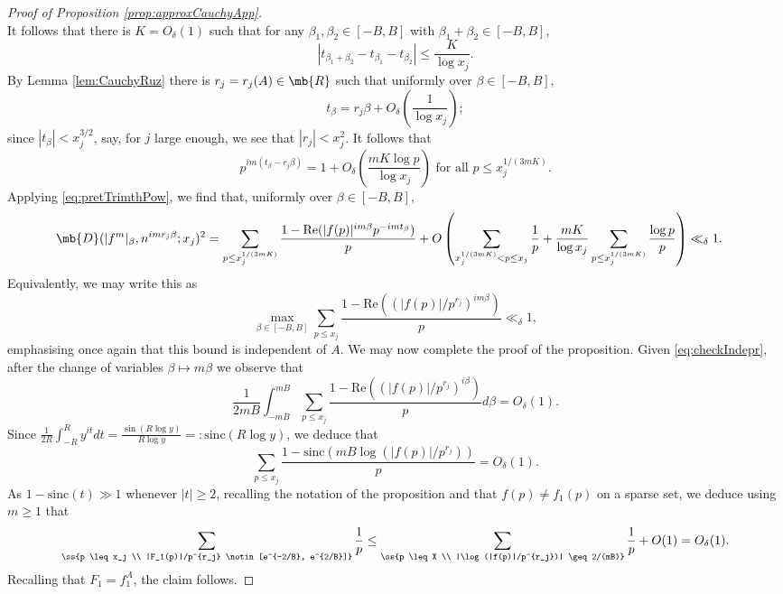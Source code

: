 \begin{proof}[Proof of Proposition \ref{prop:approxCauchyApp}]
$$$$
It follows that there is $K = O_{\delta}(1)$ such that for any $\beta_1,\beta_2 \in [-B,B]$ with $\beta_1+\beta_2 \in [-B,B]$,
$$
|t_{\beta_1+\beta_2} - t_{\beta_1} - t_{\beta_2}| \leq \frac{K}{\log x_j}. 
$$
%
By Lemma \ref{lem:CauchyRuz} there is $r_j = r_j(A) \in \mb{R}$ such that uniformly over $\beta \in [-B,B]$,
$$
t_{\beta} = r_j \beta + O_{\delta}\left(\frac{1}{\log x_j}\right);
$$
since $|t_{\beta}| < x_j^{3/2}$, say, for $j$ large enough, we see that $|r_j| < x_j^{2}$. It follows that
$$
p^{im(t_{\beta}-r_j\beta)} = 1 + O_{\delta}\left(\frac{mK \log p}{\log x_j}\right) 
%
\text{ for all } p \leq x_j^{1/(3mK)}.
$$ 
Applying \eqref{eq:pretTrimthPow}, we find that, uniformly over $\beta \in [-B,B]$, 
%
\begin{align*}
%
\mb{D}(|f^m|_{\beta}, n^{imr_j\beta};x_j)^2 &= \sum_{p \leq x_j^{1/(3mK)}} \frac{1-\text{Re}(|f(p)|^{im\beta}p^{-im t_{\beta}})}{p} + O\left(\sum_{x_j^{1/(3mK)}<p \leq x_j} \frac{1}{p} + \frac{mK}{\log x_j} \sum_{p \leq x_j^{1/(3mK)}} \frac{\log p}{p}\right) 
%
\ll_\delta 1.
\end{align*}
%
%
%
%
%
%
%
%
%
%
%
%
%
%
%
%
%
%
%
%
%
%
%
%
%
%
%
%
%
%
%
%
%
Equivalently, we may write this as
\begin{equation}\label{eq:checkIndepr}
\max_{\beta \in [-B,B]} \sum_{p \leq x_j} \frac{1-\text{Re}((|f(p)|/p^{r_j})^{im\beta})}{p} \ll_{\delta} 1,
\end{equation}
emphasising once again that this bound is independent of $A$.  
%
%
%
%
%
%
%
%
%
%
%
%
%
We may now complete the proof of the proposition. Given \eqref{eq:checkIndepr}, after the change of variables $\beta \mapsto m\beta$ we observe that
$$
\frac{1}{2mB} \int_{-mB}^{mB} \sum_{p \leq x_j} \frac{1-\text{Re}((|f(p)|/p^{r_j})^{i\beta})}{p} d\beta
%
= O_{\delta}(1).
$$
Since $\frac{1}{2R} \int_{-R}^R y^{it} dt = \frac{\sin(R \log y)}{R\log y} =: \text{sinc}(R\log y)$, we deduce that
$$
\sum_{p \leq x_j} \frac{1-\text{sinc}(mB\log(|f(p)|/p^{r_j}))}{p} = O_{\delta}(1).
$$
As $1-\text{sinc}(t) \gg 1$ whenever $|t| \geq 2$, recalling the notation of the proposition and that $f(p) \neq f_1(p)$ on a sparse set, we deduce using $m \geq 1$ that
$$
\sum_{\ss{p \leq x_j \\ |F_1(p)|/p^{r_j} \notin [e^{-2/B}, e^{2/B}]}} \frac{1}{p} \leq \sum_{\ss{p \leq X \\ |\log(|f(p)|/p^{r_j})| \geq 2/(mB)}} \frac{1}{p} + O(1) = O_{\delta}(1).
$$
%
%
%
%
%
%
%
%
%
%
%
%
%
%
%
%
%
%
%
Recalling that $F_1 = f_1^A$, the claim follows.
\end{proof}
